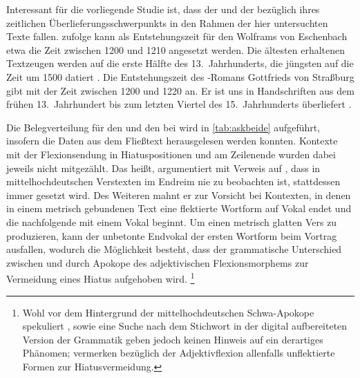 Interessant für die vorliegende Studie ist, dass der  und der
 bezüglich ihres zeitlichen Überlieferungsschwerpunkts in den
Rahmen der hier untersuchten Texte fallen. \citet[1378]{bumke1999} zufolge kann
als Entstehungszeit für den  Wolframs von Eschenbach etwa die
Zeit zwischen 1200 und 1210 angesetzt werden. Die ältesten erhaltenen
Textzeugen werden auf die erste Hälfte des 13.~Jahrhunderts, die jüngsten auf
die Zeit um 1500 datiert
\autocites[1381]{bumke1999}[vgl.~auch][s.\,v.~\textit{Wolfram von Eschenbach:
}]{hsc}. Die Entstehungszeit des -Romans Gottfrieds
von Straßburg gibt \citet[155]{kuhn1982} mit der Zeit zwischen 1200 und 1220
an. Er ist uns in Handschriften aus dem frühen 13.~Jahrhundert bis zum letzten
Viertel des 15.~Jahrhunderts überliefert
\autocite[vgl.][s.\,v.~\textit{Gottfried von Straßburg: }]{hsc}.

Die Belegverteilung für den  und den  bei
\citet{askedal1973} wird in \cref{tab:askbeide} aufgeführt, insofern die Daten
aus dem Fließtext herausgelesen werden konnten. Kontexte mit der Flexionsendung
in Hiatuspositionen und am Zeilenende wurden dabei jeweils nicht mitgezählt.
Das heißt, \citet[89--91]{askedal1973} argumentiert mit Verweis auf
\citet[662--663]{grimm1870}, dass in mittelhochdeutschen Verstexten im Endreim
nie  zu beobachten ist, stattdessen immer  gesetzt wird. Des
Weiteren mahnt er zur Vorsicht bei Kontexten, in denen in einem metrisch
gebundenen Text eine flektierte Wortform auf Vokal endet und die nachfolgende
mit einem Vokal beginnt. Um einen metrisch glatten Vers zu produzieren, kann
der unbetonte Endvokal der ersten Wortform beim Vortrag ausfallen, wodurch die
Möglichkeit besteht, dass der grammatische Unterschied zwischen  und
 durch Apokope des adjektivischen Flexionsmorphems zur Vermeidung
eines Hiatus aufgehoben wird.%
%
	\footnote{Wohl vor dem Hintergrund der mittelhochdeutschen Schwa-Apokope
		\autocites{lindgren1953}[109--111]{paul2007} spekuliert
		\citet[91]{askedal1973},  \citet[27, 109--111,
		203]{paul2007} sowie eine Suche nach dem Stichwort  in der
		digital aufbereiteten Version der Grammatik geben jedoch keinen Hinweis
		auf ein derartiges Phänomen; \citet[244]{ksw2} vermerken bezüglich der
		Adjektivflexion allenfalls unflektierte Formen zur Hiatusvermeidung.
		}
		
